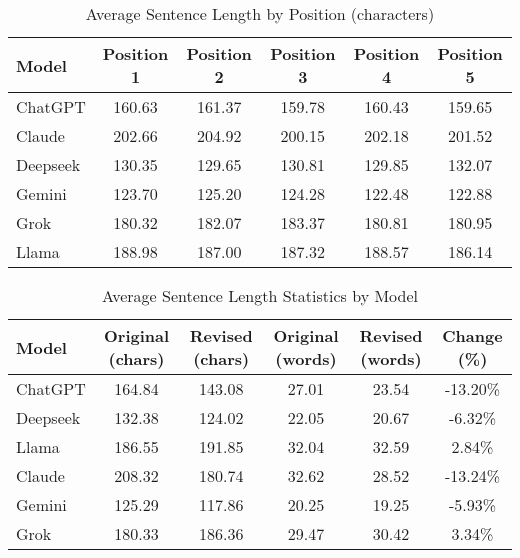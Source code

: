 \begin{table}[ht]
\centering
\caption{Average Sentence Length by Position (characters)}
\begin{tabular}{l|ccccc}
\hline
Model & Position 1 & Position 2 & Position 3 & Position 4 & Position 5 \\ \hline
ChatGPT & 160.63 & 161.37 & 159.78 & 160.43 & 159.65 \\
Claude & 202.66 & 204.92 & 200.15 & 202.18 & 201.52 \\
Deepseek & 130.35 & 129.65 & 130.81 & 129.85 & 132.07 \\
Gemini & 123.70 & 125.20 & 124.28 & 122.48 & 122.88 \\
Grok & 180.32 & 182.07 & 183.37 & 180.81 & 180.95 \\
Llama & 188.98 & 187.00 & 187.32 & 188.57 & 186.14 \\
\hline
\end{tabular}
\label{tab:position_lengths}
\end{table}

\begin{table}[ht]
\centering
\caption{Average Sentence Length Statistics by Model}
\begin{tabular}{l|cc|cc|c}
\hline
Model & Original (chars) & Revised (chars) & Original (words) & Revised (words) & Change (\%) \\ \hline
ChatGPT & 164.84 & 143.08 & 27.01 & 23.54 & -13.20\% \\
Deepseek & 132.38 & 124.02 & 22.05 & 20.67 & -6.32\% \\
Llama & 186.55 & 191.85 & 32.04 & 32.59 & 2.84\% \\
Claude & 208.32 & 180.74 & 32.62 & 28.52 & -13.24\% \\
Gemini & 125.29 & 117.86 & 20.25 & 19.25 & -5.93\% \\
Grok & 180.33 & 186.36 & 29.47 & 30.42 & 3.34\% \\
\hline
\end{tabular}
\label{tab:model_length_stats}
\end{table}